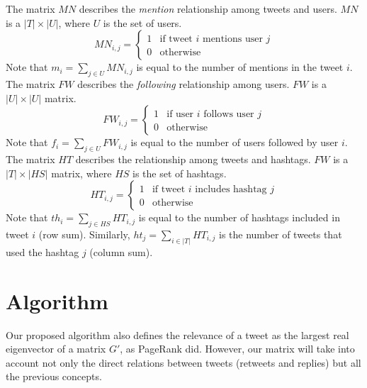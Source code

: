 \documentclass[12pt,a4paper]{article}
\begin{document}
The matrix $MN$ describes the \emph{mention} relationship among tweets and users. $MN$ is a $|T| \times |U|$, where $U$ is the set of users. 
\begin{equation}\label{eq:mentions_matrix}
MN_{i,j} = \begin{cases}
1 & \text{if tweet } i \text{ mentions user } j \\
0 & \text{otherwise}
\end{cases}
\end{equation}
Note that $m_i = \sum_{j \in U} MN_{i,j}$ is equal to the number of mentions in the tweet $i$. \\

The matrix $FW$ describes the \emph{following} relationship among users. $FW$ is a $|U| \times |U|$ matrix.
\begin{equation}
FW_{i,j} = \begin{cases}
1 & \text{if user } i \text{ follows user } j \\
0 & \text{otherwise}
\end{cases}
\end{equation}
Note that $f_i = \sum_{j \in U} FW_{i,j}$ is equal to the number of users followed by user $i$. \\


The matrix $HT$ describes the relationship among tweets and hashtags. $FW$ is a $|T| \times |HS|$ matrix, where $HS$ is the set of hashtags.
\begin{equation}
HT_{i,j} = \begin{cases}
1 & \text{if tweet } i \text{ includes hashtag } j \\
0 & \text{otherwise}
\end{cases}
\end{equation}
Note that $th_i = \sum_{j \in HS} HT_{i,j}$ is equal to the number of hashtags included in tweet $i$ (row sum). Similarly, $ht_j = \sum_{i \in |T|} HT_{i,j}$ is the number of tweets that used the hashtag $j$ (column sum).

\section{Algorithm}
Our proposed algorithm also defines the relevance of a tweet as the largest real eigenvector of a matrix $G'$, as PageRank did. However, our matrix will take into account not only the direct relations between tweets (retweets and replies) but all the previous concepts.
\end{document}
